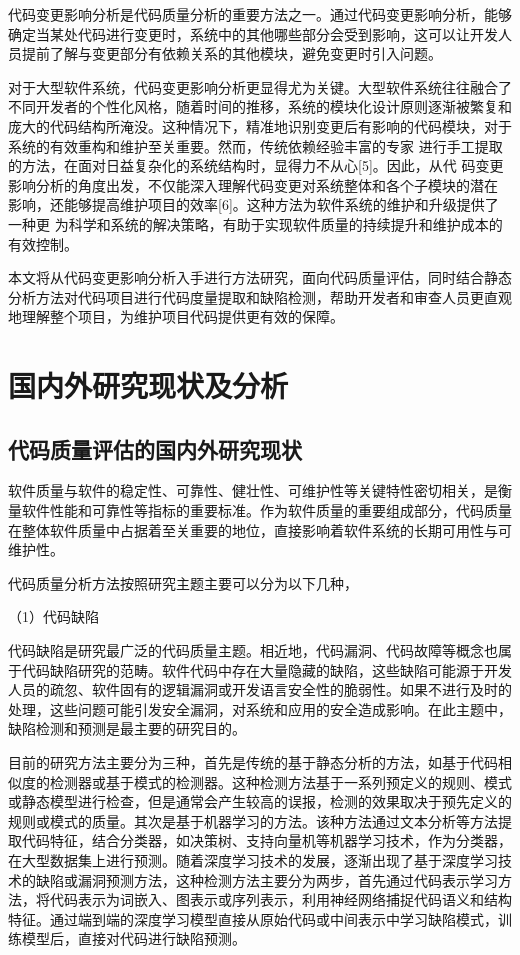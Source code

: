 代码变更影响分析是代码质量分析的重要方法之一。通过代码变更影响分析，能够确定当某处代码进行变更时，系统中的其他哪些部分会受到影响，这可以让开发人员提前了解与变更部分有依赖关系的其他模块，避免变更时引入问题。

对于大型软件系统，代码变更影响分析更显得尤为关键。大型软件系统往往融合了不同开发者的个性化风格，随着时间的推移，系统的模块化设计原则逐渐被繁复和庞大的代码结构所淹没。这种情况下，精准地识别变更后有影响的代码模块，对于系统的有效重构和维护至关重要。然而，传统依赖经验丰富的专家
进行手工提取的方法，在面对日益复杂化的系统结构时，显得力不从心[5]。因此，从代
码变更影响分析的角度出发，不仅能深入理解代码变更对系统整体和各个子模块的潜在
影响，还能够提高维护项目的效率[6]。这种方法为软件系统的维护和升级提供了一种更
为科学和系统的解决策略，有助于实现软件质量的持续提升和维护成本的有效控制。

本文将从代码变更影响分析入手进行方法研究，面向代码质量评估，同时结合静态分析方法对代码项目进行代码度量提取和缺陷检测，帮助开发者和审查人员更直观地理解整个项目，为维护项目代码提供更有效的保障。

\section{国内外研究现状及分析}


\subsection{代码质量评估的国内外研究现状}

软件质量与软件的稳定性、可靠性、健壮性、可维护性等关键特性密切相关，是衡量软件性能和可靠性等指标的重要标准。作为软件质量的重要组成部分，代码质量在整体软件质量中占据着至关重要的地位，直接影响着软件系统的长期可用性与可维护性。

代码质量分析方法按照研究主题主要可以分为以下几种，

（1）代码缺陷

代码缺陷是研究最广泛的代码质量主题。相近地，代码漏洞、代码故障等概念也属于代码缺陷研究的范畴。软件代码中存在大量隐藏的缺陷，这些缺陷可能源于开发人员的疏忽、软件固有的逻辑漏洞或开发语言安全性的脆弱性。如果不进行及时的处理，这些问题可能引发安全漏洞，对系统和应用的安全造成影响。在此主题中，缺陷检测和预测是最主要的研究目的。

目前的研究方法主要分为三种，首先是传统的基于静态分析的方法，如基于代码相似度的检测器\cite{Sheneamer2018A,2014A}或基于模式的检测器\cite{2012Mitigating,2017IDE,2016How}。这种检测方法基于一系列预定义的规则、模式或静态模型进行检查，但是通常会产生较高的误报，检测的效果取决于预先定义的规则或模式的质量。其次是基于机器学习的方法。该种方法通过文本分析等方法提取代码特征，结合分类器，如决策树、支持向量机等机器学习技术\cite{2017Assessment,2018A,2020The}，作为分类器，在大型数据集上进行预测。随着深度学习技术的发展，逐渐出现了基于深度学习技术的缺陷或漏洞预测方法，这种检测方法主要分为两步，首先通过代码表示学习方法，将代码表示为词嵌入、图表示或序列表示，利用神经网络捕捉代码语义和结构特征。通过端到端的深度学习模型直接从原始代码或中间表示中学习缺陷模式，训练模型后，直接对代码进行缺陷预测。


